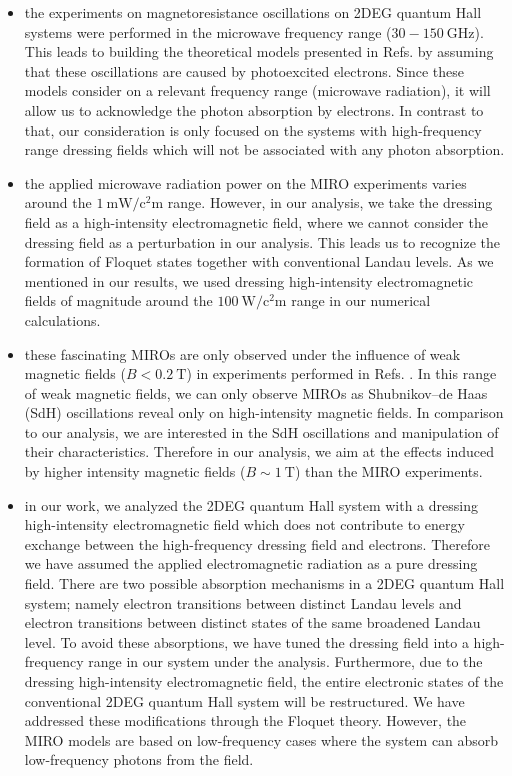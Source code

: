 \documentclass{article}
\begin{document}
\begin{itemize}
  \item
  the experiments on magnetoresistance oscillations on 2DEG quantum Hall systems \cite{zudov01,mani02,zudov03,mani04} were performed in the microwave frequency range ($30 -\SI{150}{\giga\hertz}$). This leads to building the theoretical models presented in Refs. \cite{durst03,dmitriev03} by assuming that these oscillations are caused by photoexcited electrons. Since these models consider on a relevant frequency range (microwave radiation), it will allow us to acknowledge the photon absorption by electrons. In contrast to that, our consideration is only focused on the systems with high-frequency range dressing fields which will not be associated with any photon absorption.
  \item
  the applied microwave radiation power on the MIRO experiments \cite{mani02,zudov03} varies around the  $\SI{1}{\milli\watt\per\square\centi\metre}$ range. However, in our analysis, we take the dressing field as a high-intensity electromagnetic field, where we cannot consider the dressing field as a perturbation in our analysis. This leads us to recognize the formation of Floquet states together with conventional Landau levels. As we mentioned in our results, we used dressing high-intensity electromagnetic fields of magnitude around the $\SI{100}{\watt\per\square\centi\metre}$ range in our numerical calculations.
  \item
  these fascinating MIROs are only observed under the influence of weak magnetic fields ($B < \SI{0.2}{\tesla}$) in experiments performed in Refs. \cite{zudov01,mani02,zudov03,mani04}. In this range of weak magnetic fields,  we can only observe MIROs as Shubnikov–de Haas (SdH) oscillations reveal only on high-intensity magnetic fields. In comparison to our analysis, we are  interested in the SdH oscillations and manipulation of their characteristics. Therefore in our analysis, we aim at the effects induced by higher intensity magnetic fields ($B \sim \SI{1}{\tesla}$) than the MIRO experiments.
  \item
  in our work, we analyzed the 2DEG quantum Hall system with a dressing high-intensity electromagnetic field which does not contribute to energy exchange between the high-frequency dressing field and electrons. Therefore we have assumed the applied electromagnetic radiation as a pure dressing field. There are two possible absorption mechanisms in a 2DEG quantum Hall system; namely electron transitions between distinct Landau levels and electron transitions between distinct states of the same broadened Landau level. To avoid these absorptions, we have tuned the dressing field into a high-frequency range in our system under the analysis. Furthermore, due to the dressing high-intensity electromagnetic field, the entire electronic states of the conventional 2DEG quantum Hall system will be restructured. We have addressed these modifications through the Floquet theory. However, the MIRO models \cite{durst03,dmitriev03} are based on low-frequency cases where the system can absorb low-frequency photons from the field.
\end{itemize}
\end{document}
